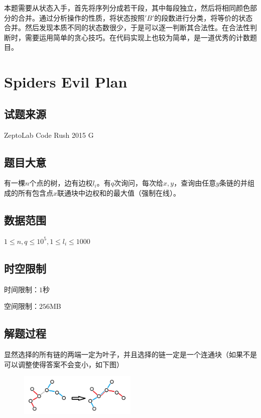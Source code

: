 \documentclass[12pt]{article}
\begin{document}
本题需要从状态入手，首先将序列分成若干段，其中每段独立，然后将相同颜色部分的合并。通过分析操作的性质，将状态按照$'B'$的段数进行分类，将等价的状态合并。然后发现本质不同的状态数很少，于是可以逐一判断其合法性。在合法性判断时，需要运用简单的贪心技巧。在代码实现上也较为简单，是一道优秀的计数题目。

\newpage

\section{Spiders Evil Plan}
\subsection{试题来源}
ZeptoLab Code Rush 2015  G
\subsection{题目大意}
有一棵$n$个点的树，边有边权$l_i$。有$q$次询问，每次给$x,y$，查询由任意$y$条链的并组成的所有包含点$x$联通块中边权和的最大值（强制在线）。

\subsection{数据范围}
$1\le n, q\le 10^5, 1\le l_i \le 1000$
\subsection{时空限制}
时间限制：$1$秒

空间限制：$256$MB
\subsection{解题过程}
显然选择的所有链的两端一定为叶子，并且选择的链一定是一个连通块（如果不是可以调整使得答案不会变小，如下图）
\begin{figure}[h] %
    \centering %
    \includegraphics[width=0.5\textwidth]{p1.png} %
    \label{p1} %
\end{figure}%
\end{document}
